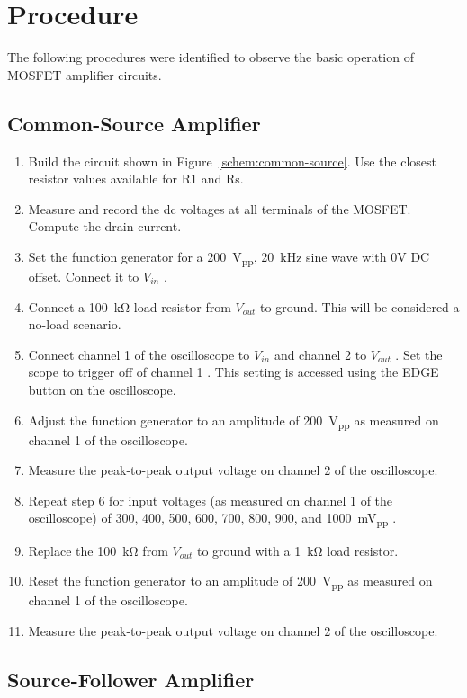 \section{Procedure}
\label{sec:procedure}

The following procedures were identified to observe the basic operation of MOSFET amplifier circuits.

\subsection{Common-Source Amplifier}

\begin{enumerate}
\item Build the circuit shown in Figure~\ref{schem:common-source}.  Use the closest resistor values available for R1 and Rs.
\item Measure and record the dc voltages at all terminals of the MOSFET.  Compute the drain current.
\item Set the function generator for a \SI{200}{V_{pp}}, \SI{20}{kHz} sine wave with 0V DC offset.  Connect it to $V_{in}$ .
\item Connect a \SI{100}{\kilo\ohm} load resistor from $V_{out}$ to ground. This will be considered a no-load scenario.
\item Connect channel 1 of the oscilloscope to $V_{in}$ and channel 2 to $V_{out}$ . Set the scope to trigger off of channel 1 . This setting is accessed using the EDGE button on the oscilloscope.
\item Adjust the function generator to an amplitude of \SI{200}{V_{pp}} as measured on channel 1 of the oscilloscope.
\item Measure the peak-to-peak output voltage on channel 2 of the oscilloscope.
\item Repeat step 6 for input voltages (as measured on channel 1 of the oscilloscope) of 300, 400, 500, 600, 700, 800, 900, and \SI{1000}{mV_{pp}} .
\item Replace the \SI{100}{\kilo\ohm} from $V_{out}$ to ground with a \SI{1}{\kilo\ohm} load resistor.
\item Reset the function generator to an amplitude of \SI{200}{V_{pp}} as measured on channel 1 of the oscilloscope.
\item Measure the peak-to-peak output voltage on channel 2 of the oscilloscope.
\end{enumerate}

\subsection{Source-Follower Amplifier}

